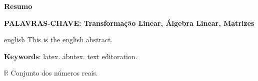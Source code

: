 \documentclass[
12pt,
 a4paper,
 chapter=TITLE,
  section=TITLE,
   subsection=TITLE,
    subsubsection=TITLE,
    brazil,
    openright,
    twoside
    ]{abntex2}
\begin{document}
	
	
	\frenchspacing 
	
	\imprimircapa
	
	\imprimirfolhaderosto
	
	\setlength{\absparsep}{18pt} %
	\begin{resumo}
		\textbf{Resumo}
		
		\textbf{PALAVRAS-CHAVE: Transformação Linear, Álgebra Linear, Matrizes}
	\end{resumo}
		
	
	\begin{resumo}[Abstract]
		\begin{otherlanguage*}{english}
			This is the english abstract.
			
			\vspace{\onelineskip}
			
			\noindent 
			\textbf{Keywords}: latex. abntex. text editoration.
		\end{otherlanguage*}
	\end{resumo}
	
	\listoftables*
	\cleardoublepage
	
	\begin{simbolos}
		\item[$ \mathbb{R} $] Conjunto dos números reais.
	\end{simbolos}
	
	
	\tableofcontents
	\cleardoublepage
	
	
	\textual
	
	
		
	
	
	
	
	
	
	
		
	
	
		
\end{document}
